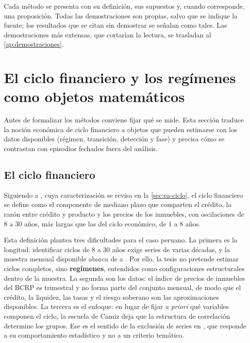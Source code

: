 Cada método se presenta con su definición, sus supuestos y, cuando corresponde, una proposición.
Todas las demostraciones son propias, salvo que se indique la fuente; los resultados que se
citan sin demostrar se señalan como tales. Las demostraciones más extensas, que cortarían la
lectura, se trasladan al \cref{ap:demostraciones}.

\section{El ciclo financiero y los regímenes como objetos matemáticos}
\label{sec:ciclo}

Antes de formalizar los métodos conviene fijar qué se mide. Esta sección traduce la noción
económica de ciclo financiero a objetos que pueden estimarse con los datos disponibles
(régimen, transición, detección y fase) y precisa cómo se contrastan con episodios fechados
fuera del análisis.

\subsection{El ciclo financiero}

Siguiendo a \textcite{drehmann_borio_tsatsaronis_2012}, cuya caracterización se revisa en la
\cref{sec:ea-ciclo}, el ciclo financiero se define como el componente de mediano plazo que
comparten el crédito, la razón entre crédito y producto y los precios de los inmuebles, con
oscilaciones de 8 a 30 años, más largas que las del ciclo económico, de 1 a 8 años.

Esta definición plantea tres dificultades para el caso peruano. La primera es la longitud:
identificar ciclos de 8 a 30 años exige series de varias décadas, y la muestra mensual disponible
abarca de \anioInicioDatos{} a \anioFinDatos{}. Por ello, la tesis no pretende estimar ciclos completos, sino
\textbf{regímenes}, entendidos como configuraciones estructurales dentro de la muestra. La
segunda son los datos: el índice de precios de inmuebles del BCRP es trimestral y no forma parte
del conjunto mensual, de modo que el crédito, la liquidez, las tasas y el riesgo soberano son las
aproximaciones disponibles. La tercera es el enfoque: en lugar de fijar \emph{a priori} qué
variables componen el ciclo, la escuela de Camiz deja que la estructura de correlación determine
los grupos. Ese es el sentido de la exclusión de series en \textcite{camiz_cerda_atoche_2026},
que responde a su comportamiento estadístico y no a un criterio temático.

